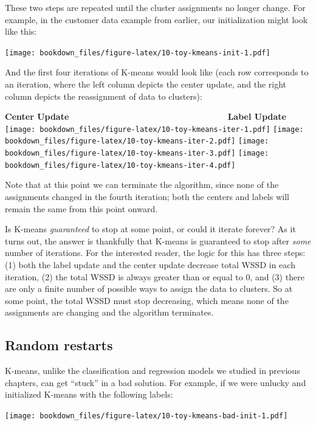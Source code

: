\documentclass[
]{krantz}
\renewenvironment{quote}{\begin{VF}}{\end{VF}}
\begin{document}
These two steps are repeated until the cluster assignments no longer change.
For example, in the customer data example from earlier, our initialization might look like this:

\texttt{[image: bookdown\_files/figure-latex/10-toy-kmeans-init-1.pdf]}

And the first four iterations of K-means would look like (each row corresponds to an iteration,
where the left column depicts the center update,
and the right column depicts the reassignment of data to clusters):

\textbf{Center Update}                            \textbf{Label Update}
\texttt{[image: bookdown\_files/figure-latex/10-toy-kmeans-iter-1.pdf]} \texttt{[image: bookdown\_files/figure-latex/10-toy-kmeans-iter-2.pdf]} \texttt{[image: bookdown\_files/figure-latex/10-toy-kmeans-iter-3.pdf]} \texttt{[image: bookdown\_files/figure-latex/10-toy-kmeans-iter-4.pdf]}

Note that at this point we can terminate the algorithm, since none of the assignments changed
in the fourth iteration; both the centers and labels will remain the same from this point onward.

\begin{quote}
Is K-means \emph{guaranteed} to stop at some point, or could it iterate forever? As it turns out,
the answer is thankfully that K-means is guaranteed to stop after \emph{some} number of iterations. For the interested reader, the
logic for this has three steps: (1) both the label update and the center update decrease total WSSD in each iteration,
(2) the total WSSD is always greater than or equal to 0, and (3) there are only a finite number of possible
ways to assign the data to clusters. So at some point, the total WSSD must stop decreasing, which means none of the assignments
are changing and the algorithm terminates.
\end{quote}

\hypertarget{random-restarts}{%
\subsection{Random restarts}\label{random-restarts}}

K-means, unlike the classification and regression models we studied in previous chapters, can get ``stuck'' in a bad solution.
For example, if we were unlucky and initialized K-means with the following labels:

\texttt{[image: bookdown\_files/figure-latex/10-toy-kmeans-bad-init-1.pdf]}
\end{document}
